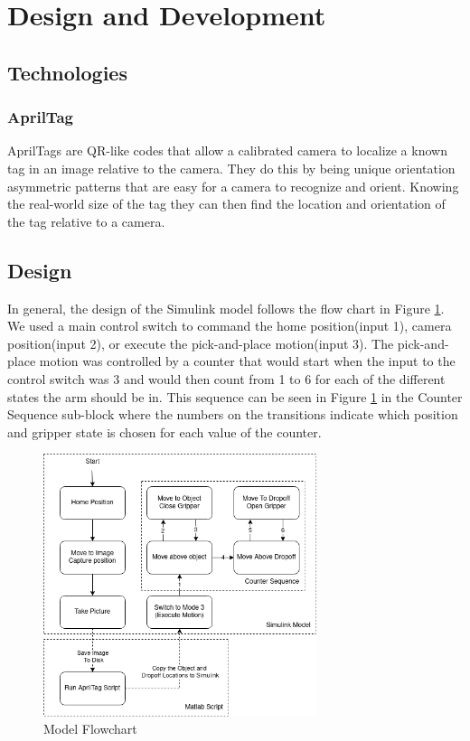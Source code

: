 \section{Design and Development}

\subsection{Technologies}
\subsubsection{AprilTag}
AprilTags are QR-like codes that allow a calibrated camera to localize a known tag in an image relative to the camera. They do this by being unique orientation asymmetric patterns that are easy for a camera to recognize and orient. Knowing the real-world size of the tag they can then find the location and orientation of the tag relative to a camera. \cite{DetectAprilDemo} \cite{AprilTagRepo}


\subsection{Design}

In general, the design of the Simulink model follows the flow chart in Figure \ref{Fig:Model_Flowchart}. We used a main control switch to command the home position(input 1), camera position(input 2), or execute the pick-and-place motion(input 3). The pick-and-place motion was controlled by a counter that would start when the input to the control switch was 3 and would then count from 1 to 6 for each of the different states the arm should be in. This sequence can be seen in Figure \ref{Fig:Model_Flowchart} in the Counter Sequence sub-block where the numbers on the transitions indicate which position and gripper state is chosen for each value of the counter.

\begin{figure}[htb]
\includegraphics[width=8cm]{Figures/IntroRob_Final_Project_StateMachine_v2.drawio.png}
\caption{Model Flowchart}
\label{Fig:Model_Flowchart}
\centering
\end{figure}



